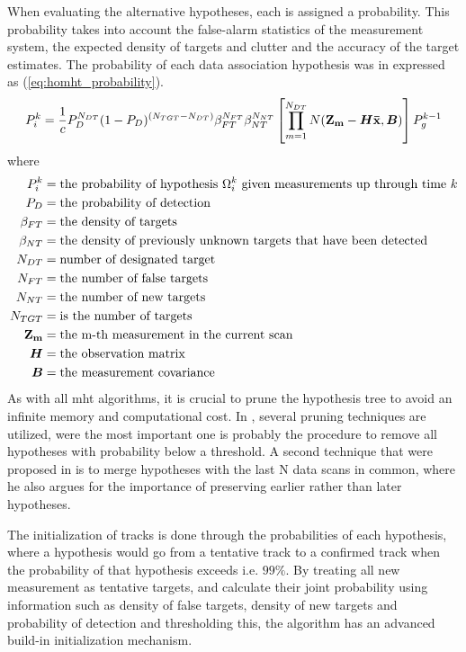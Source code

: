 When evaluating the alternative hypotheses, each is assigned a probability. This probability takes into account the false-alarm statistics of the measurement system, the expected density of \glspl{target} and clutter and the accuracy of the \gls{target} estimates. The probability of each data association hypothesis was in \cite{Reid1979} expressed as (\ref{eq:homht_probability}).
\begin{equation}
P_i^k = \frac{1}{c} P_D^{N_{DT}}(1-P_D)^{(N_{TGT}-N_{DT})} \beta_{FT}^{N_{FT}} \beta_{NT}^{N_{NT}} \left[ \prod_{m=1}^{N_{DT}} N(\boldsymbol{\mathbf{Z_m}}-\bm{H}\boldsymbol{\mathbf{\bar{x}}},\bm{B}) \right] P_g^{k-1}
\label{eq:homht_probability}
\end{equation}
where 
\begin{equation*}
\begin{split}
	P_i^k		&= \text{the probability of hypothesis $\Omega_i^k$ given measurements up through time $k$} \\
	P_D 		&= \text{the probability of detection} \\
	\beta_{FT} 	&= \text{the density of targets} \\ 
	\beta_{NT}	&= \text{the density of previously unknown targets that have been detected} \\
	N_{DT} 		&=	\text{number of designated target} \\
	N_{FT} 		&= \text{the number of false targets} \\
	N_{NT} 		&= \text{the number of new targets} \\
	N_{TGT} 	&= \text{is the number of targets} \\
	\boldsymbol{\mathbf{Z_m}} 	&= \text{the m-th measurement in the current scan} \\
	\bm{H} 		&= \text{the observation matrix} \\
	\bm{B} 		&= \text{the measurement covariance}
\end{split}
\end{equation*}
As with all \gls{mht} algorithms, it is crucial to prune the hypothesis tree to avoid an infinite memory and computational cost. In \cite{Reid1979}, several pruning techniques are utilized, were the most important one is probably the procedure to remove all hypotheses with probability below a threshold. A second technique that were proposed in \cite{Reid1979} is to merge hypotheses with the last N data scans in common, where he also argues for the importance of preserving earlier rather than later hypotheses. 

The initialization of tracks is done through the probabilities of each hypothesis, where a hypothesis would go from a tentative track to a confirmed track when the probability of that hypothesis exceeds i.e. $99 \%$. By treating all new \gls{measurement} as tentative \glspl{target}, and calculate their joint probability using information such as density of false \glspl{target}, density of new \glspl{target} and probability of detection and thresholding this, the algorithm has an advanced build-in initialization mechanism.

